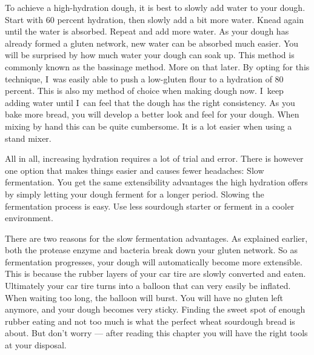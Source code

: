 To achieve a high-hydration dough, it is best to slowly add water to
your dough. Start with 60 percent hydration, then slowly add a bit more water. Knead
again until the water is absorbed. Repeat and add more water. As your dough
has already formed a gluten network, new water can be absorbed much easier.
You will be surprised by how much water your dough can soak up. This
method is commonly known as the bassinage method. More on that later.
By opting for this technique, I~was easily able to push a low-gluten flour
to a hydration of 80 percent. This
is also my method of choice when making dough now. I~keep adding water until
I~can feel that the dough has the right consistency. As you bake more bread,
you will develop a better look and feel for your dough. When mixing
by hand this can be quite cumbersome. It is a lot easier when using a stand
mixer.

All in all, increasing hydration requires a lot of trial and error. There
is however one option that makes things easier and causes fewer headaches:
Slow fermentation. You get the same extensibility advantages the high hydration
offers by simply letting your dough ferment for a longer period.
Slowing the fermentation process is easy. Use less
sourdough starter or ferment in a cooler environment.

There are two reasons for the slow fermentation advantages.
As explained earlier, both the protease enzyme and bacteria break down your
gluten network. So as fermentation progresses, your dough will automatically
become more extensible. This is because the rubber layers of your car tire
are slowly converted and eaten. Ultimately your car tire turns into a balloon
that can very easily be inflated. When waiting too long, the
balloon will burst. You will have no gluten left anymore, and your dough
becomes very sticky. Finding the sweet spot of enough rubber eating and not
too much is what the perfect wheat sourdough bread is about. But don't worry --- after reading
this chapter you will have the right tools at your disposal.

